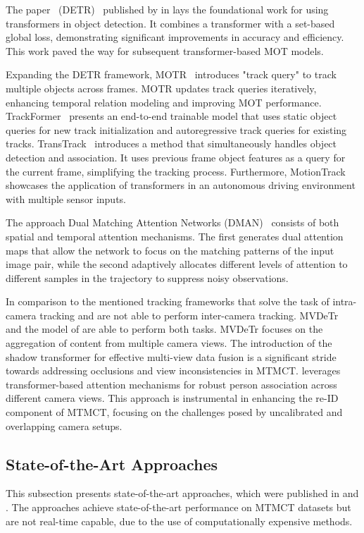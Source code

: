 The paper ~(DETR)~\cite{Carion20} published by \citeauthor{Carion20} in \citeyear{Carion20} lays the foundational work for using transformers in object detection. It combines a transformer with a set-based global loss, demonstrating significant improvements in accuracy and efficiency. This work paved the way for subsequent transformer-based MOT models.

Expanding the DETR framework, MOTR~\cite{Zeng21} introduces "track query" to track multiple objects across frames. MOTR updates track queries iteratively, enhancing temporal relation modeling and improving MOT performance. TrackFormer~\cite{Meinhardt22} presents an end-to-end trainable model that uses static object queries for new track initialization and autoregressive track queries for existing tracks. TransTrack~\cite{Sun20} introduces a method that simultaneously handles object detection and association. It uses previous frame object features as a query for the current frame, simplifying the tracking process. Furthermore, MotionTrack~\cite{Zhang23} showcases the application of transformers in an autonomous driving environment with multiple sensor inputs.

The approach Dual Matching Attention Networks (DMAN)~\cite{Zhu19} consists of both spatial and temporal attention mechanisms. The first generates dual attention maps that allow the network to focus on the matching patterns of the input image pair, while the second adaptively allocates different levels of attention to different samples in the trajectory to suppress noisy observations.

In comparison to the mentioned tracking frameworks that solve the task of intra-camera tracking and are not able to perform inter-camera tracking. MVDeTr~\cite{Hou21} and the model of \textcite{Li21} are able to perform both tasks. MVDeTr focuses on the aggregation of content from multiple camera views. The introduction of the shadow transformer for effective multi-view data fusion is a significant stride towards addressing occlusions and view inconsistencies in MTMCT. \cite{Li21} leverages transformer-based attention mechanisms for robust person association across different camera views. This approach is instrumental in enhancing the re-ID component of MTMCT, focusing on the challenges posed by uncalibrated and overlapping camera setups.

\subsection{State-of-the-Art Approaches}\label{subsec:state-of-the-art_approaches}
This subsection presents state-of-the-art approaches, which were published in \citeyear{Hsu22} and \citeyear{Teepe23}. The approaches achieve state-of-the-art performance on MTMCT datasets but are not real-time capable, due to the use of computationally expensive methods.

